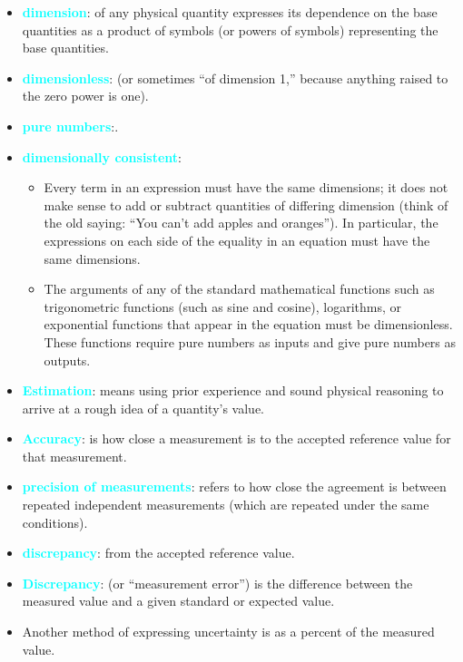 \documentclass{report}
\begin{document}
\begin{itemize}
        \item \textbf{\textcolor{cyan}{dimension}}: of any physical quantity expresses its dependence on the base quantities as a product of symbols (or powers of symbols) representing the base quantities.
        \item \textbf{\textcolor{cyan}{dimensionless}}: (or sometimes “of dimension 1,” because anything raised to the zero power is one). 
        \item \textbf{\textcolor{cyan}{pure numbers}}:.
        \item \textbf{\textcolor{cyan}{dimensionally consistent}}:
            \begin{itemize}
                \item Every term in an expression must have the same dimensions; it does not make sense to add or subtract quantities of differing dimension (think of the old saying: “You can’t add apples and oranges”). In particular, the expressions on each side of the equality in an equation must have the same dimensions.
                \item The arguments of any of the standard mathematical functions such as trigonometric functions (such as sine and cosine), logarithms, or exponential functions that appear in the equation must be dimensionless. These functions require pure numbers as inputs and give pure numbers as outputs.
            \end{itemize}
        \item \textbf{\textcolor{cyan}{Estimation}}: means using prior experience and sound physical reasoning to arrive at a rough idea of a quantity’s value.
        \item \textbf{\textcolor{cyan}{Accuracy}}: is how close a measurement is to the accepted reference value for that measurement.
        \item \textbf{\textcolor{cyan}{precision of measurements}}: refers to how close the agreement is between repeated independent measurements (which are repeated under the same conditions).
        \item \textbf{\textcolor{cyan}{discrepancy}}: from the accepted reference value.
        \item \textbf{\textcolor{cyan}{Discrepancy}}: (or “measurement error”) is the difference between the measured value and a given standard or expected value.
        \item   Another method of expressing uncertainty is as a percent of the measured value. 
    \end{itemize}
\end{document}
